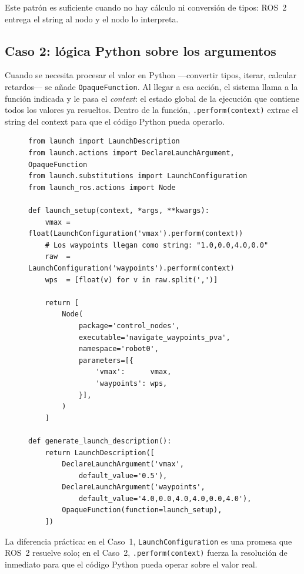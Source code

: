 Este patrón es suficiente cuando no hay cálculo ni conversión de tipos: ROS~2 entrega el string al nodo y el nodo lo interpreta.

\subsection{Caso 2: lógica Python sobre los argumentos}

Cuando se necesita procesar el valor en Python —convertir tipos, iterar, calcular retardos— se añade \texttt{OpaqueFunction}. Al llegar a esa acción, el sistema llama a la función indicada y le pasa el \textit{context}: el estado global de la ejecución que contiene todos los valores ya resueltos. Dentro de la función, \texttt{.perform(context)} extrae el string del context para que el código Python pueda operarlo.

\begin{figure}[H]
\centering
\begin{lstlisting}[style=python,
    caption={Launch file con \texttt{OpaqueFunction}. Se usa cuando
             hay conversión de tipos o cálculos sobre los argumentos.},
    label={lst:launch_opaque}]
from launch import LaunchDescription
from launch.actions import DeclareLaunchArgument, OpaqueFunction
from launch.substitutions import LaunchConfiguration
from launch_ros.actions import Node

def launch_setup(context, *args, **kwargs):
    vmax = float(LaunchConfiguration('vmax').perform(context))
    # Los waypoints llegan como string: "1.0,0.0,4.0,0.0"
    raw  = LaunchConfiguration('waypoints').perform(context)
    wps  = [float(v) for v in raw.split(',')]

    return [
        Node(
            package='control_nodes',
            executable='navigate_waypoints_pva',
            namespace='robot0',
            parameters=[{
                'vmax':      vmax,
                'waypoints': wps,
            }],
        )
    ]

def generate_launch_description():
    return LaunchDescription([
        DeclareLaunchArgument('vmax',
            default_value='0.5'),
        DeclareLaunchArgument('waypoints',
            default_value='4.0,0.0,4.0,4.0,0.0,4.0'),
        OpaqueFunction(function=launch_setup),
    ])
\end{lstlisting}
\end{figure}

La diferencia práctica: en el Caso~1, \texttt{LaunchConfiguration} es una promesa que ROS~2 resuelve solo; en el Caso~2, \texttt{.perform(context)} fuerza la resolución de inmediato para que el código Python pueda operar sobre el valor real.

